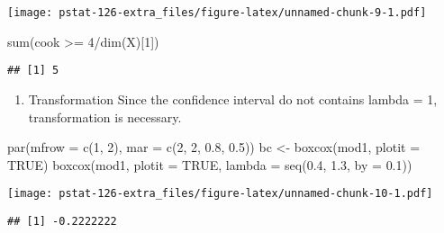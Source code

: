 \documentclass[
]{article}
\newenvironment{Shaded}{\begin{snugshade}}{\end{snugshade}}
\newcommand{\AttributeTok}[1]{\textcolor[rgb]{0.77,0.63,0.00}{#1}}
\newcommand{\ConstantTok}[1]{\textcolor[rgb]{0.00,0.00,0.00}{#1}}
\newcommand{\DecValTok}[1]{\textcolor[rgb]{0.00,0.00,0.81}{#1}}
\newcommand{\FloatTok}[1]{\textcolor[rgb]{0.00,0.00,0.81}{#1}}
\newcommand{\FunctionTok}[1]{\textcolor[rgb]{0.00,0.00,0.00}{#1}}
\newcommand{\NormalTok}[1]{#1}
\newcommand{\OtherTok}[1]{\textcolor[rgb]{0.56,0.35,0.01}{#1}}
\newcommand{\SpecialCharTok}[1]{\textcolor[rgb]{0.00,0.00,0.00}{#1}}
\providecommand{\tightlist}{%
  \setlength{\itemsep}{0pt}\setlength{\parskip}{0pt}}
\begin{document}
\texttt{[image: pstat-126-extra\_files/figure-latex/unnamed-chunk-9-1.pdf]}

\begin{Shaded}
\begin{Highlighting}[]
\FunctionTok{sum}\NormalTok{(cook }\SpecialCharTok{\textgreater{}=} \DecValTok{4}\SpecialCharTok{/}\FunctionTok{dim}\NormalTok{(X)[}\DecValTok{1}\NormalTok{])}
\end{Highlighting}
\end{Shaded}

\begin{verbatim}
## [1] 5
\end{verbatim}

\begin{enumerate}
\def\labelenumi{\arabic{enumi}.}
\setcounter{enumi}{2}
\tightlist
\item
  Transformation Since the confidence interval do not contains lambda =
  1, transformation is necessary.
\end{enumerate}

\begin{Shaded}
\begin{Highlighting}[]
\FunctionTok{par}\NormalTok{(}\AttributeTok{mfrow =} \FunctionTok{c}\NormalTok{(}\DecValTok{1}\NormalTok{, }\DecValTok{2}\NormalTok{), }\AttributeTok{mar =} \FunctionTok{c}\NormalTok{(}\DecValTok{2}\NormalTok{, }\DecValTok{2}\NormalTok{, }\FloatTok{0.8}\NormalTok{, }\FloatTok{0.5}\NormalTok{))}
\NormalTok{bc }\OtherTok{\textless{}{-}} \FunctionTok{boxcox}\NormalTok{(mod1, }\AttributeTok{plotit =} \ConstantTok{TRUE}\NormalTok{)}
\FunctionTok{boxcox}\NormalTok{(mod1, }\AttributeTok{plotit =} \ConstantTok{TRUE}\NormalTok{, }\AttributeTok{lambda =} \FunctionTok{seq}\NormalTok{(}\FloatTok{0.4}\NormalTok{, }\FloatTok{1.3}\NormalTok{, }\AttributeTok{by =} \FloatTok{0.1}\NormalTok{))}
\end{Highlighting}
\end{Shaded}

\texttt{[image: pstat-126-extra\_files/figure-latex/unnamed-chunk-10-1.pdf]}

\begin{Shaded}
\end{Shaded}

\begin{verbatim}
## [1] -0.2222222
\end{verbatim}
\end{document}
